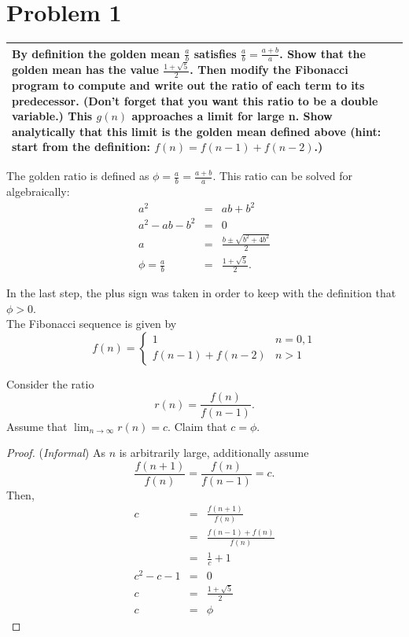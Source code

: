 \documentclass[aps,letterpaper,10pt]{article}
\begin{document}
\section{Problem 1}
\begin{center}
\begin{minipage}[h]{.85\linewidth}
\begin{tabular}{|p{\linewidth}|}
\hline
By definition the golden mean $\frac{a}{b}$ satisfies $\frac{a}{b} = \frac{a+b}{a}$. Show that the golden mean has the value $\frac{1+\sqrt{5}}{2}$. Then modify the Fibonacci program to compute and write out the ratio of each term to its predecessor. (Don't forget that you want this ratio to be a double variable.)  This $g(n)$ approaches a limit for large n. Show analytically that this limit is the golden mean defined above (hint: start from the definition: $f(n) = f(n-1) + f(n-2)$.)\\
\hline
\end{tabular}
\end{minipage}

\end{center}


\vspace{2em}
The golden ratio is defined as $\phi = \frac{a}{b} = \frac{a + b}{a}$. This ratio can be solved for algebraically:
\begin{eqnarray*}
  a^2 & = & ab + b^2 \\
  a^2 - ab - b^2 & = & 0\\
  a & = & \frac{b \pm \sqrt{b^2 + 4b^2}}{2}\\
  \phi =  \frac{a}{b} & = & \frac{1 + \sqrt{5}}{2}.
\end{eqnarray*}

In the last step, the plus sign was taken in order to keep with the definition that $\phi>0$.\\

The Fibonacci sequence is given by 
\begin{displaymath}
  f(n) = \left\{
  \begin{array}{ll}
    1 &  n=0,1\\
    f(n-1) + f(n-2) & n>1
  \end{array}\right.
\end{displaymath}

Consider the ratio $$r(n) = \frac{f(n)}{f(n-1)}.$$ Assume that $\lim_{n\to\infty}r(n)=c$. Claim that $c=\phi$.\\

\begin{proof}
({\em Informal}) As $n$ is arbitrarily large, additionally assume $$\frac{f(n+1)}{f(n)} = \frac{f(n)}{f(n-1)} = c.$$ Then,
\begin{eqnarray*}
  c & = & \frac{f(n+1)}{f(n)}\\
    & = & \frac{f(n-1) + f(n)}{f(n)}\\
    & = & \frac{1}{c} + 1\\
  c^2 - c - 1 & = & 0\\
  c & = & \frac{1 + \sqrt{5}}{2}\\
  c & = & \phi
\end{eqnarray*}
\end{proof}
\end{document}
